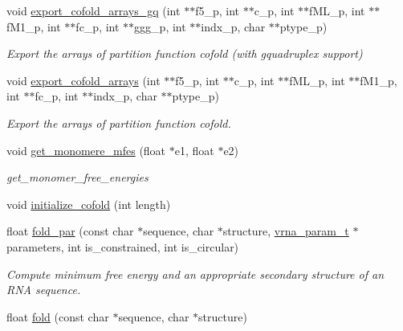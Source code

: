 \begin{DoxyCompactItemize}
void \mbox{\hyperlink{group__mfe__global__deprecated_ga5f5bf4df35d0554f6ace9579f8744c48}{export\+\_\+cofold\+\_\+arrays\+\_\+gq}} (int $\ast$$\ast$f5\+\_\+p, int $\ast$$\ast$c\+\_\+p, int $\ast$$\ast$f\+M\+L\+\_\+p, int $\ast$$\ast$f\+M1\+\_\+p, int $\ast$$\ast$fc\+\_\+p, int $\ast$$\ast$ggg\+\_\+p, int $\ast$$\ast$indx\+\_\+p, char $\ast$$\ast$ptype\+\_\+p)
\begin{DoxyCompactList}\small\item\em Export the arrays of partition function cofold (with gquadruplex support) \end{DoxyCompactList}\item 
void \mbox{\hyperlink{group__mfe__global__deprecated_ga5cb6b59983f1f74ccc00b9b9c4e84482}{export\+\_\+cofold\+\_\+arrays}} (int $\ast$$\ast$f5\+\_\+p, int $\ast$$\ast$c\+\_\+p, int $\ast$$\ast$f\+M\+L\+\_\+p, int $\ast$$\ast$f\+M1\+\_\+p, int $\ast$$\ast$fc\+\_\+p, int $\ast$$\ast$indx\+\_\+p, char $\ast$$\ast$ptype\+\_\+p)
\begin{DoxyCompactList}\small\item\em Export the arrays of partition function cofold. \end{DoxyCompactList}\item 
void \mbox{\hyperlink{group__mfe__global__deprecated_ga4958b517c613e4d2afd5bce6c1060a79}{get\+\_\+monomere\+\_\+mfes}} (float $\ast$e1, float $\ast$e2)
\begin{DoxyCompactList}\small\item\em get\+\_\+monomer\+\_\+free\+\_\+energies \end{DoxyCompactList}\item 
void \mbox{\hyperlink{group__mfe__global__deprecated_gafee0c32208aa2ac97338b6e3fbad7fa5}{initialize\+\_\+cofold}} (int length)
\item 
float \mbox{\hyperlink{group__mfe__global__deprecated_ga2bc41df5d71fee6fd8da9904ee65d8fb}{fold\+\_\+par}} (const char $\ast$sequence, char $\ast$structure, \mbox{\hyperlink{group__energy__parameters_ga8a69ca7d787e4fd6079914f5343a1f35}{vrna\+\_\+param\+\_\+t}} $\ast$parameters, int is\+\_\+constrained, int is\+\_\+circular)
\begin{DoxyCompactList}\small\item\em Compute minimum free energy and an appropriate secondary structure of an R\+NA sequence. \end{DoxyCompactList}\item 
float \mbox{\hyperlink{group__mfe__global__deprecated_gaadafcb0f140795ae62e5ca027e335a9b}{fold}} (const char $\ast$sequence, char $\ast$structure)
$$
\end{DoxyCompactItemize}
